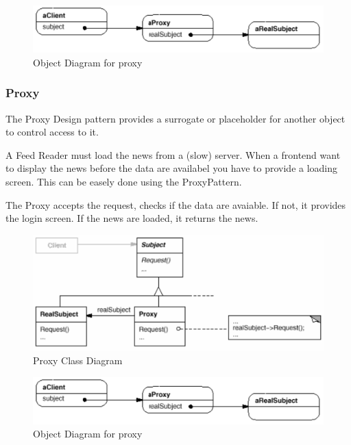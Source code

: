\documentclass[11pt]{article}
\begin{document}
\begin{figure}[htbp]
\centering
\includegraphics[width=.9\linewidth]{img/proxy_object_diagram.png}
\caption{\label{fig:object-diagram-for-proxy}Object Diagram for proxy}
\end{figure}
\subsubsection{Proxy}
\label{sec:org3c4a4d4}
The Proxy Design pattern provides a surrogate or placeholder for another object to control access to it.

A Feed Reader must load the news from a (slow) server.
When a frontend want to display the news before the data are availabel you have to provide a loading screen.
This can be easely done using the ProxyPattern.

The Proxy accepts the request, checks if the data are avaiable.
If not, it provides the login screen.
If the news are loaded, it returns the news.


\begin{figure}[htbp]
\centering
\includegraphics[width=.9\linewidth]{img/proxy.png}
\caption{\label{fig:proxy-class-diagram}Proxy Class Diagram}
\end{figure}


\begin{figure}[htbp]
\centering
\includegraphics[width=.9\linewidth]{img/proxy_object_diagram.png}
\caption{\label{fig:object-diagram-for-proxy}Object Diagram for proxy}
\end{figure}
\end{document}
